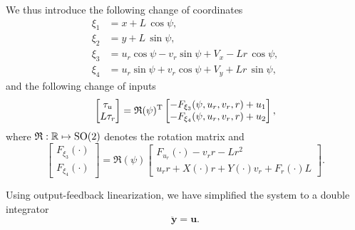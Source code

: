 We thus introduce the following change of coordinates 
\begin{subequations}
    \begin{align}
        \xi_1 &= x + L\,\cos\psi, \\
        \xi_2 &= y + L\,\sin\psi, \\
        \xi_3 &= u_{r}\cos\psi - v_{r}\sin\psi + V_x - L r\,\cos \psi, \\
        \xi_4 &= u_{r}\sin\psi + v_{r}\cos\psi + V_y + L r\,\sin \psi,
    \end{align}
\end{subequations}
and the following change of inputs 
\begin{equation}
    \begin{bmatrix} \tau_u \\ L\tau_r \end{bmatrix} 
    = 
    \mathfrak{R}(\psi)^{\mathrm{T}} \begin{bmatrix}-F_{\xi_{3}}(\psi, u_r, v_r, r)+u_{1}\\-F_{\xi_{4}}(\psi, u_r, v_r, r)+u_{2}\end{bmatrix}, 
\end{equation}
where $\mathfrak{R} : \mathbb{R} \mapsto {\rm SO}(2)$ denotes the rotation matrix and
\begin{equation}
    \begin{bmatrix}F_{\xi_{3}}(\cdot)\\F_{\xi_{4}}(\cdot)\end{bmatrix}
    = 
    \mathfrak{R}(\psi)\begin{bmatrix}F_{u_r}(\cdot)-v_{r}r-Lr^2 \\ u_{r}r+X(\cdot)r+Y(\cdot)v_{r}+F_r(\cdot)L\end{bmatrix}.
\end{equation}

Using output-feedback linearization, we have simplified the system to a double integrator 
\begin{equation}
    \ddot{\bm{y}} = \bm{u}. 
\end{equation}

